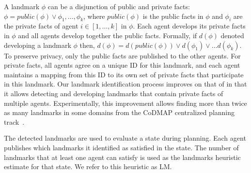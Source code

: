 \documentclass[letterpaper]{article}
\newcommand{\public}{\textit{public}}
\theoremstyle{definition}
\begin{document}
A landmark $\phi$ can be a disjunction of public and private facts: $\phi=\public(\phi)\vee \phi_1,\ldots,\phi_k$,
where $\public(\phi)$ is the public facts in $\phi$ and $\phi_i$ are the private facts of agent $i\in[1,\ldots,k]$ in $\phi$.
Each agent develops its private facts in $\phi$ and all agents develop together the public facts. Formally, if
 $d(\phi)$ denoted developing a landmark $\phi$ then, $d(\phi)=d(\public(\phi))\vee d(\phi_1) \vee \dots d(\phi_k)$.
To preserve privacy, only the public facts are published to the other agents. For private facts, all agents agree on a unique ID for this landmark, and each agent maintains a mapping from this ID to its own set of private facts that participate in this landmark.
Our landmark identification process improves on that of \cite{maliah2014privacyPreserving} in that it allows detecting and developing landmarks that contain private facts of multiple agents. Experimentally, this improvement allows finding more than twice as many landmarks in some domains from the CoDMAP centralized planning track~\cite{vstolba2015competition}.


The detected landmarks are used to evaluate a state during planning. Each agent publishes which landmarks it identified as satisfied in the state. The number of landmarks that at least one agent can satisfy is used as the landmarks heuristic estimate for that state. We refer to this heuristic as LM.






\end{document}
